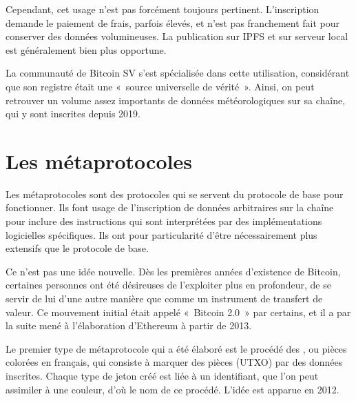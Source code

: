 Cependant, cet usage n'est pas forcément toujours pertinent. L'inscription demande le paiement de frais, parfois élevés, et n'est pas franchement fait pour conserver des données volumineuses. La publication sur IPFS et sur serveur local est généralement bien plus opportune.

La communauté de Bitcoin SV s'est spécialisée dans cette utilisation, considérant que son registre était une «~source universelle de vérité~». Ainsi, on peut retrouver un volume assez importants de données météorologiques sur sa chaîne, qui y sont inscrites depuis 2019.

\section*{Les métaprotocoles}

Les métaprotocoles sont des protocoles qui se servent du protocole de base pour fonctionner. Ils font usage de l'inscription de données arbitraires sur la chaîne pour inclure des instructions qui sont interprétées par des implémentations logicielles spécifiques. Ils ont pour particularité d'être nécessairement plus extensifs que le protocole de base.

Ce n'est pas une idée nouvelle. Dès les premières années d'existence de Bitcoin, certaines personnes ont été désireuses de l'exploiter plus en profondeur, de se servir de lui d'une autre manière que comme un instrument de transfert de valeur. Ce mouvement initial était appelé «~Bitcoin 2.0~» par certains, et il a par la suite mené à l'élaboration d'Ethereum à partir de 2013.

Le premier type de métaprotocole qui a été élaboré est le procédé des , ou pièces colorées en français, qui consiste à marquer des pièces (UTXO) par des données inscrites. Chaque type de jeton créé est liée à un identifiant, que l'on peut assimiler à une couleur, d'où le nom de ce procédé. L'idée est apparue en 2012. %


